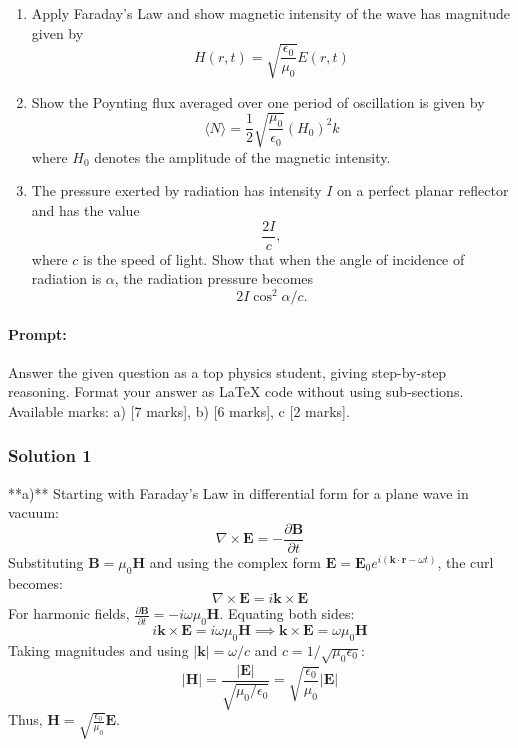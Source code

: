 \documentclass{article}
\begin{document}
\begin{enumerate}
    \item[(a)] Apply Faraday’s Law and show magnetic intensity of the wave has magnitude given by
    \[
    H(r, t) = \sqrt{\frac{\epsilon_0}{\mu_0}} E(r, t)
    \]

    \item[(b)] Show the Poynting flux averaged over one period of oscillation is given by
    \[
    \langle N \rangle = \frac{1}{2} \sqrt{\frac{\mu_0}{\epsilon_0}} (H_0)^2 \hat{k}
    \]
    where \(H_0\) denotes the amplitude of the magnetic intensity.

    \item[(c)] The pressure exerted by radiation has intensity \(I\) on a perfect planar reflector and has the value
    \[
    \frac{2I}{c},
    \]
    where \(c\) is the speed of light. Show that when the angle of incidence of radiation is \(\alpha\), the radiation pressure becomes
    \[
    2I \cos^2 \alpha / c.
    \]
\end{enumerate}


\paragraph{Prompt: \\} 
Answer the given question as a top physics student, giving step-by-step reasoning. Format your answer as LaTeX code without using sub-sections. Available marks: a) [7 marks], b) [6 marks], c [2 marks].

\subsubsection{Solution 1}
**a)** Starting with Faraday's Law in differential form for a plane wave in vacuum:
\[
\nabla \times \mathbf{E} = -\frac{\partial \mathbf{B}}{\partial t}
\]
Substituting \(\mathbf{B} = \mu_0 \mathbf{H}\) and using the complex form \(\mathbf{E} = \mathbf{E}_0 e^{i(\mathbf{k} \cdot \mathbf{r} - \omega t)}\), the curl becomes:
\[
\nabla \times \mathbf{E} = i\mathbf{k} \times \mathbf{E}
\]
For harmonic fields, \(\frac{\partial \mathbf{B}}{\partial t} = -i\omega \mu_0 \mathbf{H}\). Equating both sides:
\[
i\mathbf{k} \times \mathbf{E} = i\omega \mu_0 \mathbf{H} \implies \mathbf{k} \times \mathbf{E} = \omega \mu_0 \mathbf{H}
\]
Taking magnitudes and using \(|\mathbf{k}| = \omega/c\) and \(c = 1/\sqrt{\mu_0 \epsilon_0}\):
\[
|\mathbf{H}| = \frac{|\mathbf{E}|}{\sqrt{\mu_0/\epsilon_0}} = \sqrt{\frac{\epsilon_0}{\mu_0}} |\mathbf{E}|
\]
Thus, \(\mathbf{H} = \sqrt{\frac{\epsilon_0}{\mu_0}} \mathbf{E}\).
\end{document}
